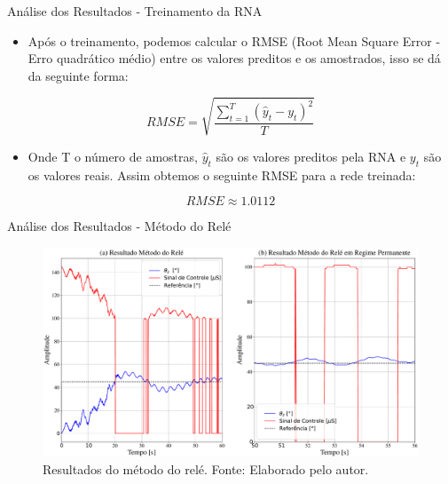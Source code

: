 \documentclass{beamer}
\begin{document}

\begin{frame}{Análise dos Resultados - Treinamento da RNA}
	\begin{itemize}
		\item Após o treinamento, podemos calcular o RMSE (Root Mean Square Error - Erro quadrático médio) entre os valores preditos e os amostrados, isso se dá da seguinte forma:
	\end{itemize}
\begin{equation}
RMSE = \sqrt{\frac{\sum_{t=1}^{T}(\hat{y}_t-y_t)^2}{T}}
\end{equation}
	\begin{itemize}
		\item Onde T o número de amostras, $\hat{y}_t$ são os valores preditos pela RNA e $y_t$ são os valores reais. Assim obtemos o seguinte RMSE para a rede treinada:
	\end{itemize}
\begin{equation}
RMSE \approx 1.0112
\end{equation}
\end{frame}


\begin{frame}{Análise dos Resultados - Método do Relé}
     \begin{figure}[HT]
		\begin{center}
		\captionsetup{justification=centering}
        \includegraphics[scale=.22]{../resultados/img/relay}
        \caption{Resultados do método do relé. \newline
        		 Fonte: Elaborado pelo autor.}
		\label{FIG_ADAPTATIVO}
        \end{center}
	\end{figure}
\end{frame}
\end{document}
